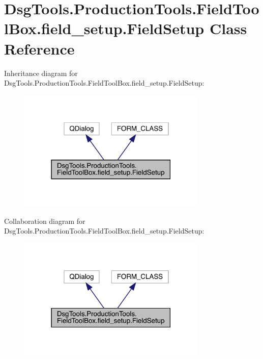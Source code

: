 \hypertarget{class_dsg_tools_1_1_production_tools_1_1_field_tool_box_1_1field__setup_1_1_field_setup}{}\section{Dsg\+Tools.\+Production\+Tools.\+Field\+Tool\+Box.\+field\+\_\+setup.\+Field\+Setup Class Reference}
\label{class_dsg_tools_1_1_production_tools_1_1_field_tool_box_1_1field__setup_1_1_field_setup}


Inheritance diagram for Dsg\+Tools.\+Production\+Tools.\+Field\+Tool\+Box.\+field\+\_\+setup.\+Field\+Setup\+:
\nopagebreak
\begin{figure}[H]
\begin{center}
\leavevmode
\includegraphics[width=255pt]{class_dsg_tools_1_1_production_tools_1_1_field_tool_box_1_1field__setup_1_1_field_setup__inherit__graph}
\end{center}
\end{figure}


Collaboration diagram for Dsg\+Tools.\+Production\+Tools.\+Field\+Tool\+Box.\+field\+\_\+setup.\+Field\+Setup\+:
\nopagebreak
\begin{figure}[H]
\begin{center}
\leavevmode
\includegraphics[width=255pt]{class_dsg_tools_1_1_production_tools_1_1_field_tool_box_1_1field__setup_1_1_field_setup__coll__graph}
\end{center}
\end{figure}
